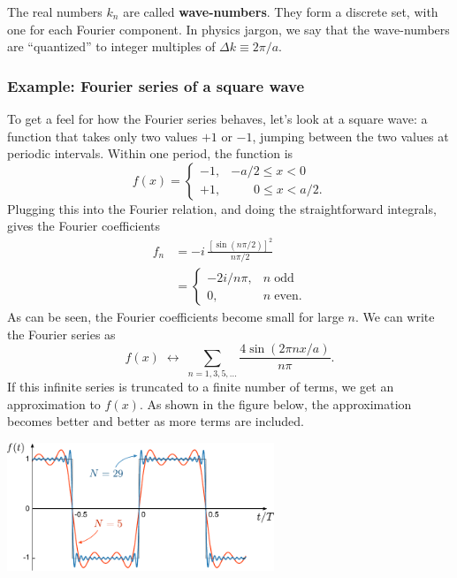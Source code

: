 \documentclass[10pt,a4paper]{article}
\begin{document}
\noindent
The real numbers $k_n$ are called \textbf{wave-numbers}. They form a
discrete set, with one for each Fourier component. In physics jargon, we
say that the wave-numbers are ``quantized'' to integer multiples of
$\Delta k \equiv 2\pi/a.$

\subsubsection{Example: Fourier series of a square wave}
\label{example-fourier-series-of-a-square-wave}

To get a feel for how the Fourier series behaves, let's look at a
square wave: a function that takes only two values $+1$ or $-1$,
jumping between the two values at periodic intervals. Within one
period, the function is
\begin{equation}
  f(x) = \left\{\begin{array}{ll}-1, & -a/2 \le x < 0 \\ +1, & \quad\;\;\; 0 \le x < a/2.\end{array}\right.
\end{equation}
Plugging this into the Fourier relation, and doing the straightforward
integrals, gives the Fourier coefficients
\begin{align}
  f_n &= -i \, \frac{\left[\sin\left(n \pi/2\right)\right]^2}{n\pi/2 } \\
  &= \left\{\begin{array}{cl} -2i/n\pi ,& n \; \mathrm{odd} \\
  0,& n \; \mathrm{even}.
  \end{array}
  \right.
\end{align}
As can be seen, the Fourier coefficients become small for large $n$.
We can write the Fourier series as
\begin{equation}
f(x) \; \leftrightarrow \; \sum_{n=1,3,5,\dots} \frac{4\sin(2\pi n x / a)}{n \pi}.
\end{equation}
If this infinite series is truncated to a finite number of terms, we
get an approximation to $f(x)$. As shown in the figure below, the
approximation becomes better and better as more terms are included.

\begin{center}
  \includegraphics[width=0.6\textwidth]{square_fourier}
\end{center}
\end{document}
